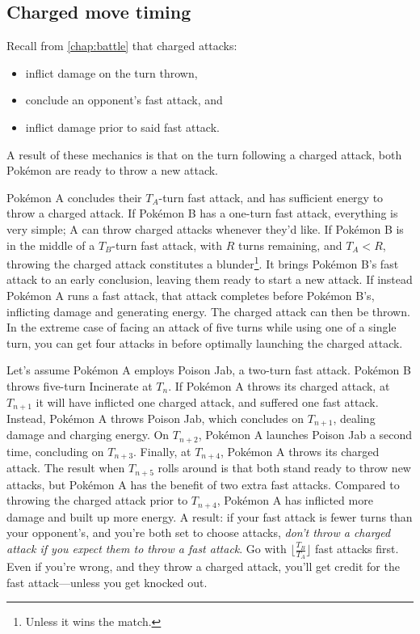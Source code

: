 \subsection{Charged move timing\label{subsec:cmt}}
Recall from \autoref{chap:battle} that charged attacks:
\begin{itemize}
\item inflict damage on the turn thrown,
\item conclude an opponent's fast attack, and
\item inflict damage prior to said fast attack.
\end{itemize}
A result of these mechanics is that on the turn following a charged attack,
 both Pokémon are ready to throw a new attack.

Pokémon A concludes their $T_A$-turn fast attack, and has sufficient energy to throw a charged attack.
If Pokémon B has a one-turn fast attack, everything is very simple;
 A can throw charged attacks whenever they'd like.
If Pokémon B is in the middle of a $T_B$-turn fast attack, with $R$ turns remaining,
 and $T_A < R$, throwing the charged attack constitutes a blunder\footnote{Unless it wins the match.}.
It brings Pokémon B's fast attack to an early conclusion, leaving them ready to start a new attack.
If instead Pokémon A runs a fast attack, that attack completes before Pokémon B's, inflicting damage and generating energy.
The charged attack can then be thrown.
In the extreme case of facing an attack of five turns while using one of a single turn,
  you can get four attacks in before optimally launching the charged attack.

Let's assume Pokémon A employs Poison Jab, a two-turn fast attack.
Pokémon B throws five-turn Incinerate at $T_n$.
If Pokémon A throws its charged attack, at $T_{n+1}$ it will have inflicted
  one charged attack, and suffered one fast attack.
Instead, Pokémon A throws Poison Jab, which concludes on $T_{n+1}$, dealing damage and charging energy.
On $T_{n+2}$, Pokémon A launches Poison Jab a second time, concluding on $T_{n+3}$.
Finally, at $T_{n+4}$, Pokémon A throws its charged attack.
The result when $T_{n+5}$ rolls around is that both stand ready to throw new attacks,
  but Pokémon A has the benefit of two extra fast attacks.
Compared to throwing the charged attack prior to $T_{n+4}$,
  Pokémon A has inflicted more damage and built up more energy.
A result: if your fast attack is fewer turns than your opponent's,
 and you're both set to choose attacks,
 \textit{don't throw a charged attack if you expect them to throw a fast attack}.
Go with $\lfloor\frac{T_B}{T_A}\rfloor$ fast attacks first.
Even if you're wrong, and they throw a charged attack, you'll get credit for the fast attack---unless you get knocked out.

